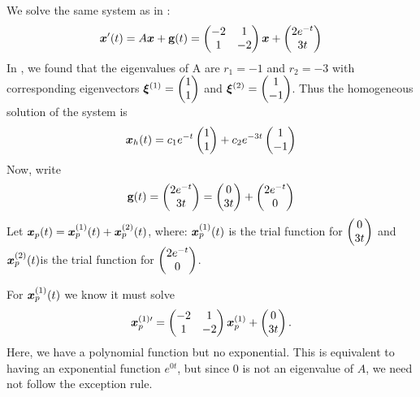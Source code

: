 \begin{eg}\label{eg:nonhom2}
	We solve the same system as in :
	\[ 
	\bm{x}'(t) = A\bm{x} + \textbf{g}(t) = \begin{pmatrix}-2&1\\1&-2\end{pmatrix} \bm{x} + \begin{pmatrix}2e^{-t}\\3t\end{pmatrix}
	\]
	In , we found that the eigenvalues of A are $r_1 = -1$ and $r_2 = -3$ with corresponding eigenvectors $\bm{\xi}^{(1)} = \begin{pmatrix}1 \\ 1\end{pmatrix}$ and $\bm{\xi}^{(2)} = \begin{pmatrix}1 \\ -1\end{pmatrix}$. Thus the homogeneous solution of the system is
	\[
	\bm{x}_h(t) = c_1e^{-t} \begin{pmatrix}1\\1\end{pmatrix} + c_2e^{-3t} \begin{pmatrix}1\\-1\end{pmatrix}
	\]
	Now, write
	\begin{equation}
		\textbf{g}(t) = \begin{pmatrix}2e^{-t}\\3t\end{pmatrix} = \begin{pmatrix}0\\3t\end{pmatrix} +\begin{pmatrix}2e^{-t}\\0\end{pmatrix}
	\end{equation}
	Let $\bm{x}_p(t) = \bm{x}_p^{(1)}(t) + \bm{x}_p^{(2)}(t)$, where: $\bm{x}_p^{(1)}(t)$ is the trial function for $\begin{pmatrix}0\\3t\end{pmatrix}$ and $\bm{x}_p^{(2)}(t)$is the trial function for $\begin{pmatrix}2e^{-t}\\0\end{pmatrix}$.
	
	For $\bm{x}_p^{(1)}(t)$ we know it must solve
	\[
	\bm{x}_p^{(1)\prime} = \begin{pmatrix}-2&1\\1&-2\end{pmatrix}\bm{x}_p^{(1)} + \begin{pmatrix}0\\3t\end{pmatrix}.
	\]
	Here, we have a polynomial function but no exponential. This is equivalent to having an exponential function $e^{0t}$, but since 0 is not an eigenvalue of $A$, we need not follow the exception rule.
	

\end{eg}
